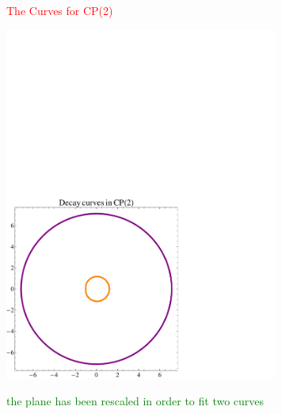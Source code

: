 \documentclass[12pt,letterpaper,landscape,KOMA,smallheadings,calcdimensions,display]{powersem}
\begin{document}
\begin{slide}

\centerline{\textcolor{red}{\Large The Curves for CP(2)}}

\vspace{-4.5cm}
\begin{center}
\hspace{2.5cm}
\includegraphics[width=9.0cm]{ccp2.pdf}
\end{center}

\centerline{\textcolor{green}{\small the plane has been rescaled in order to fit two curves}}

\end{slide}
\end{document}
